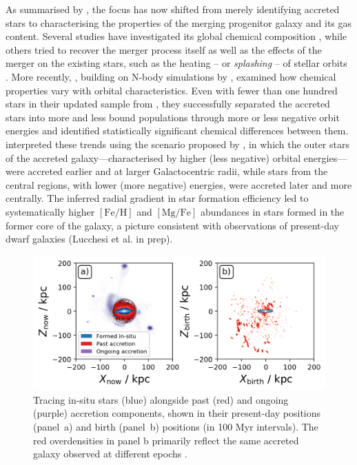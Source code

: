 \documentclass[fleqn,usenatbib]{mnras}
\begin{document}
As summarised by \citet{Helmi2020}, the focus has now shifted from merely identifying accreted stars to characterising the properties of the merging progenitor galaxy and its gas content. Several studies have investigated its global chemical composition \citep[for example][]{Das2020, Feuillet2021, Aguado2021, Matsuno2021, Buder2022, Belokurov2022, DeSilva2023, Monty2024, Ou2024}, while others tried to recover the merger process itself \citep[for example][]{Naidu2021} as well as the effects of the merger on the existing stars, such as the heating -- or \textit{splashing} -- of stellar orbits \citep{DiMatteo2019, Belokurov2020, Belokurov2022}. More recently, \citet{Skuladottir2025}, building on N-body simulations by \citet{Mori2024}, examined how chemical properties vary with orbital characteristics. Even with fewer than one hundred stars in their updated sample from \citet{Nissen2010, Nissen2024}, they successfully separated the accreted stars into more and less bound populations through more or less negative orbit energies and identified statistically significant chemical differences between them. \citet{Skuladottir2025} interpreted these trends using the scenario proposed by \citet{Mori2024}, in which the outer stars of the accreted galaxy—characterised by higher (less negative) orbital energies—were accreted earlier and at larger Galactocentric radii, while stars from the central regions, with lower (more negative) energies, were accreted later and more centrally. The inferred radial gradient in star formation efficiency led to systematically higher $\mathrm{[Fe/H]}$ and $\mathrm{[Mg/Fe]}$ abundances in stars formed in the former core of the galaxy, a picture consistent with observations of present-day dwarf galaxies (Lucchesi et al. in prep).

\begin{figure}
    \centering
    \includegraphics[width=0.99\columnwidth]{figures/tracing_insitu_accretion_2.png}
    \caption{Tracing in-situ stars (blue) alongside past (red) and ongoing (purple) accretion components, shown in their present-day positions (panel~a) and birth (panel~b) positions (in 100 Myr intervals). The red overdensities in panel b primarily reflect the same accreted galaxy observed at different epochs \href{https://github.com/svenbuder/golden_thread_I/tree/main/figures}{\faGithub}.}
    \label{fig:tracing_insitu_accretion_2}
\end{figure}
\end{document}
